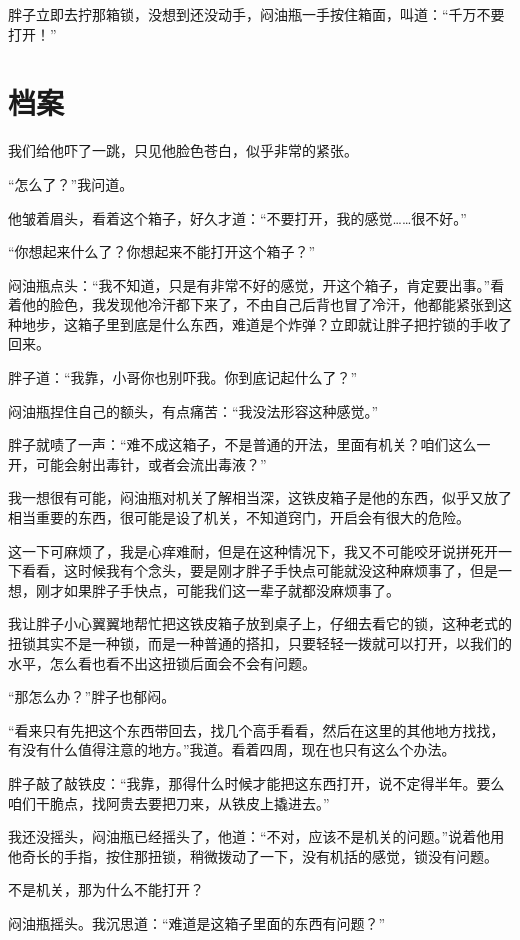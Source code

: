 胖子立即去拧那箱锁，没想到还没动手，闷油瓶一手按住箱面，叫道：“千万不要打开！”

\chapter{档案}

我们给他吓了一跳，只见他脸色苍白，似乎非常的紧张。

“怎么了？”我问道。

他皱着眉头，看着这个箱子，好久才道：“不要打开，我的感觉……很不好。”

“你想起来什么了？你想起来不能打开这个箱子？”

闷油瓶点头：“我不知道，只是有非常不好的感觉，开这个箱子，肯定要出事。”看着他的脸色，我发现他冷汗都下来了，不由自己后背也冒了冷汗，他都能紧张到这种地步，这箱子里到底是什么东西，难道是个炸弹？立即就让胖子把拧锁的手收了回来。

胖子道：“我靠，小哥你也别吓我。你到底记起什么了？”

闷油瓶捏住自己的额头，有点痛苦：“我没法形容这种感觉。”

胖子就啧了一声：“难不成这箱子，不是普通的开法，里面有机关？咱们这么一开，可能会射出毒针，或者会流出毒液？”

我一想很有可能，闷油瓶对机关了解相当深，这铁皮箱子是他的东西，似乎又放了相当重要的东西，很可能是设了机关，不知道窍门，开启会有很大的危险。

这一下可麻烦了，我是心痒难耐，但是在这种情况下，我又不可能咬牙说拼死开一下看看，这时候我有个念头，要是刚才胖子手快点可能就没这种麻烦事了，但是一想，刚才如果胖子手快点，可能我们这一辈子就都没麻烦事了。

我让胖子小心翼翼地帮忙把这铁皮箱子放到桌子上，仔细去看它的锁，这种老式的扭锁其实不是一种锁，而是一种普通的搭扣，只要轻轻一拨就可以打开，以我们的水平，怎么看也看不出这扭锁后面会不会有问题。

“那怎么办？”胖子也郁闷。

“看来只有先把这个东西带回去，找几个高手看看，然后在这里的其他地方找找，有没有什么值得注意的地方。”我道。看着四周，现在也只有这么个办法。

胖子敲了敲铁皮：“我靠，那得什么时候才能把这东西打开，说不定得半年。要么咱们干脆点，找阿贵去要把刀来，从铁皮上撬进去。”

我还没摇头，闷油瓶已经摇头了，他道：“不对，应该不是机关的问题。”说着他用他奇长的手指，按住那扭锁，稍微拨动了一下，没有机括的感觉，锁没有问题。

不是机关，那为什么不能打开？

闷油瓶摇头。我沉思道：“难道是这箱子里面的东西有问题？”

